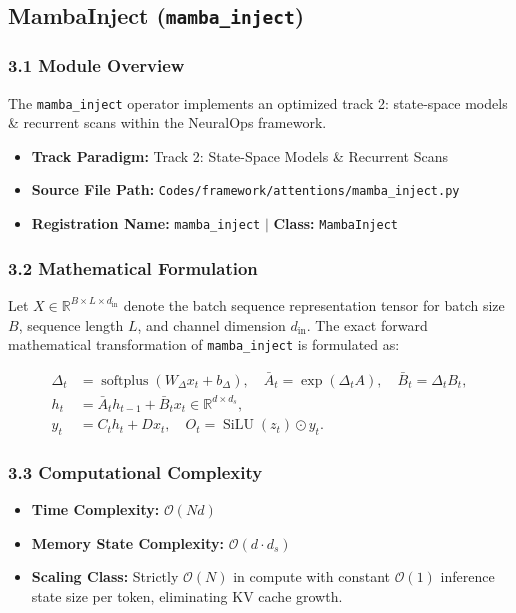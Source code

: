 \subsection{MambaInject (\texttt{mamba\_inject})}
\label{sec:app_module_mamba\_inject}

\subsubsection*{3.1 Module Overview}
The \texttt{mamba\_inject} operator implements an optimized track 2: state-space models \& recurrent scans within the NeuralOps framework.
\begin{itemize}
    \item \textbf{Track Paradigm:} Track 2: State-Space Models & Recurrent Scans
    \item \textbf{Source File Path:} \texttt{Codes/framework/attentions/mamba\_inject.py}
    \item \textbf{Registration Name:} \texttt{mamba\_inject} $\mid$ \textbf{Class:} \texttt{MambaInject}
\end{itemize}

\subsubsection*{3.2 Mathematical Formulation}
Let $X \in \mathbb{R}^{B \times L \times d_{\text{in}}}$ denote the batch sequence representation tensor for batch size $B$, sequence length $L$, and channel dimension $d_{\text{in}}$. The exact forward mathematical transformation of \texttt{mamba\_inject} is formulated as:

\begin{align}
\Delta_t &= \operatorname{softplus}(W_\Delta x_t + b_\Delta), \quad \bar{A}_t = \exp(\Delta_t A), \quad \bar{B}_t = \Delta_t B_t, \\
h_t &= \bar{A}_t h_{t-1} + \bar{B}_t x_t \in \mathbb{R}^{d \times d_s}, \\
y_t &= C_t h_t + D x_t, \quad O_t = \operatorname{SiLU}(z_t) \odot y_t.
\end{align}


\subsubsection*{3.3 Computational Complexity}
\begin{itemize}
    \item \textbf{Time Complexity:} $\mathcal{O}(N d)$
    \item \textbf{Memory State Complexity:} $\mathcal{O}(d \cdot d_s)$
    \item \textbf{Scaling Class:} Strictly $\mathcal{O}(N)$ in compute with constant $\mathcal{O}(1)$ inference state size per token, eliminating KV cache growth.
\end{itemize}

